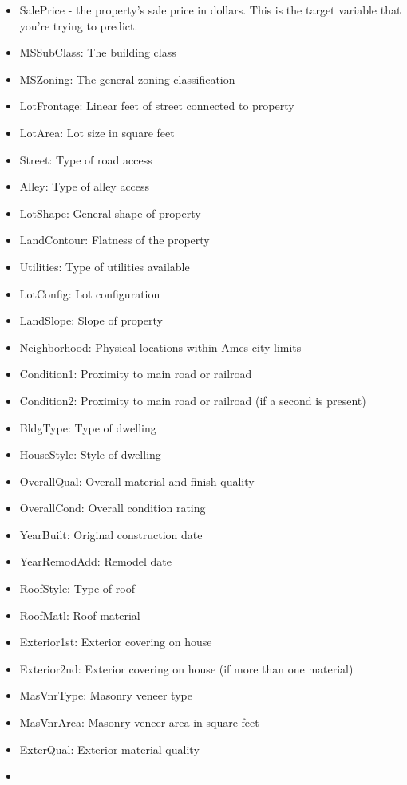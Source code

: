 \documentclass[11pt]{article}
\providecommand{\tightlist}{%
      \setlength{\itemsep}{0pt}\setlength{\parskip}{0pt}}
\begin{document}
\begin{itemize}
\tightlist
\item
  SalePrice - the property's sale price in dollars. This is the target
  variable that you're trying to predict.
\item
  MSSubClass: The building class
\item
  MSZoning: The general zoning classification
\item
  LotFrontage: Linear feet of street connected to property
\item
  LotArea: Lot size in square feet
\item
  Street: Type of road access
\item
  Alley: Type of alley access
\item
  LotShape: General shape of property
\item
  LandContour: Flatness of the property
\item
  Utilities: Type of utilities available
\item
  LotConfig: Lot configuration
\item
  LandSlope: Slope of property
\item
  Neighborhood: Physical locations within Ames city limits
\item
  Condition1: Proximity to main road or railroad
\item
  Condition2: Proximity to main road or railroad (if a second is
  present)
\item
  BldgType: Type of dwelling
\item
  HouseStyle: Style of dwelling
\item
  OverallQual: Overall material and finish quality
\item
  OverallCond: Overall condition rating
\item
  YearBuilt: Original construction date
\item
  YearRemodAdd: Remodel date
\item
  RoofStyle: Type of roof
\item
  RoofMatl: Roof material
\item
  Exterior1st: Exterior covering on house
\item
  Exterior2nd: Exterior covering on house (if more than one material)
\item
  MasVnrType: Masonry veneer type
\item
  MasVnrArea: Masonry veneer area in square feet
\item
  ExterQual: Exterior material quality
\item

\end{itemize}
\end{document}
